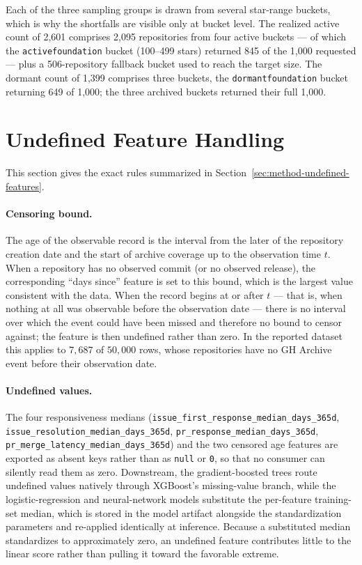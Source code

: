 Each of the three sampling groups is drawn from several star-range buckets, which is why the shortfalls are visible only at bucket level. The realized active count of 2{,}601 comprises 2{,}095 repositories from four active buckets --- of which the \texttt{active\sdash foundation} bucket (100--499 stars) returned 845 of the 1{,}000 requested --- plus a 506-repository fallback bucket used to reach the target size. The dormant count of 1{,}399 comprises three buckets, the \texttt{dormant\sdash foundation} bucket returning 649 of 1{,}000; the three archived buckets returned their full 1{,}000.

\section{Undefined Feature Handling}
\label{sec:appendix-undefined-features}

This section gives the exact rules summarized in Section~\ref{sec:method-undefined-features}.

\paragraph{Censoring bound.} The age of the observable record is the interval from the later of the repository creation date and the start of archive coverage up to the observation time \(t\). When a repository has no observed commit (or no observed release), the corresponding ``days since'' feature is set to this bound, which is the largest value consistent with the data. When the record begins at or after \(t\) --- that is, when nothing at all was observable before the observation date --- there is no interval over which the event could have been missed and therefore no bound to censor against; the feature is then undefined rather than zero. In the reported dataset this applies to \(7{,}687\) of \(50{,}000\) rows, whose repositories have no GH Archive event before their observation date.

\paragraph{Undefined values.} The four responsiveness medians (\texttt{issue\_first\_response\_median\_days\_365d}, \texttt{issue\_resolution\_median\_days\_365d}, \texttt{pr\_response\_median\_days\_365d}, \texttt{pr\_merge\_latency\_median\_days\_365d}) and the two censored age features are exported as absent keys rather than as \texttt{null} or \texttt{0}, so that no consumer can silently read them as zero. Downstream, the gradient-boosted trees route undefined values natively through XGBoost's missing-value branch, while the logistic-regression and neural-network models substitute the per-feature training-set median, which is stored in the model artifact alongside the standardization parameters and re-applied identically at inference. Because a substituted median standardizes to approximately zero, an undefined feature contributes little to the linear score rather than pulling it toward the favorable extreme.


